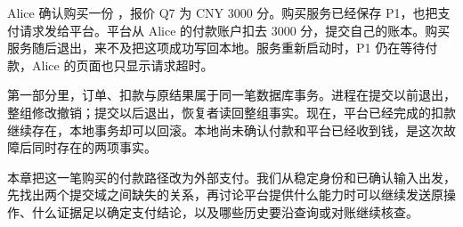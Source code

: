 \newcommand{\CSevenFigure}[3]{%
  \begin{figure}[htbp]
  \centering
  \begingroup
  \definecolor{Blue}{HTML}{315E76}
  \definecolor{Pale}{HTML}{F1F5F7}
  \definecolor{Gold}{HTML}{A96B34}
  \tikzset{every node/.style={font=\small\sffamily,align=center},
    box/.style={draw=Blue,rounded corners=2pt,fill=Pale,inner sep=7pt,text width=3.6cm,minimum height=1cm},
    good/.style={box,fill=green!5!white,draw=green!35!black},
    warn/.style={box,fill=orange!7,draw=Gold},
    arr/.style={-{Stealth[length=2mm]},thick,draw=Blue},
    note/.style={font=\footnotesize\sffamily,align=center,text=black!75},
    lane/.style={draw=black!35,densely dashed}}
  \resizebox{.98\linewidth}{!}{}
  \endgroup
  \caption{#2}\label{#3}
  \end{figure}}

Alice 确认购买一份 ，报价 Q7 为 CNY 3000 分。购买服务已经保存 P1，也把支付请求发给平台。平台从 Alice 的付款账户扣去 3000 分，提交自己的账本。购买服务随后退出，来不及把这项成功写回本地。服务重新启动时，P1 仍在等待付款，Alice 的页面也只显示请求超时。

第一部分里，订单、扣款与原结果属于同一笔数据库事务。进程在提交以前退出，整组修改撤销；提交以后退出，恢复者读回整组事实。现在，平台已经完成的扣款继续存在，本地事务却可以回滚。本地尚未确认付款和平台已经收到钱，是这次故障后同时存在的两项事实。

本章把这一笔购买的付款路径改为外部支付。我们从稳定身份和已确认输入出发，先找出两个提交域之间缺失的关系，再讨论平台提供什么能力时可以继续发送原操作、什么证据足以确定支付结论，以及哪些历史要沿查询或对账继续核查。
